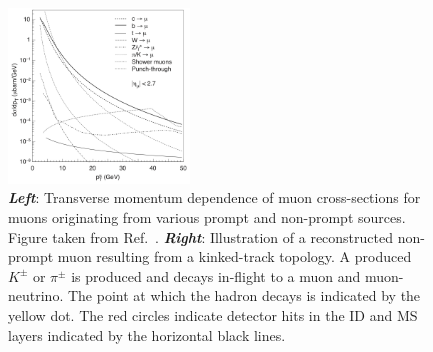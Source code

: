 \begin{figure}[!htb]
    \begin{center}
        \includegraphics[width=0.43\textwidth]{figures/common_ana/fakes/reco_muon_sources}
        \caption{
            \textbf{\textit{Left}}:  Transverse momentum dependence of muon cross-sections for muons originating
                from various prompt and non-prompt sources.
                Figure taken from Ref.~\cite{CERN-LHCC-97-022}.
            \textbf{\textit{Right}}: Illustration of a reconstructed non-prompt muon resulting from a kinked-track topology.
                A produced $K^{\pm}$ or $\pi^{\pm}$ is produced and decays in-flight to a muon and muon-neutrino.
                The point at which the hadron decays is indicated by the yellow dot.
                The red circles indicate detector hits in the ID and MS layers indicated
                by the horizontal black lines.
        }
        \label{fig:fake_muon_kink}
    \end{center}
\end{figure}


%
%

